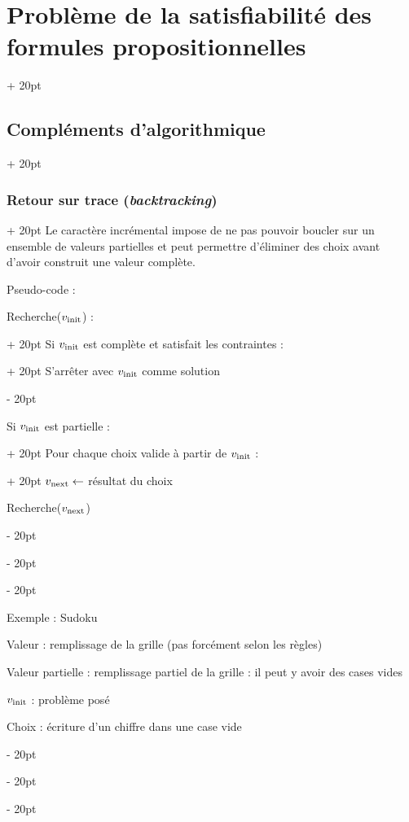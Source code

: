 \documentclass[a4paper, 12pt, twoside]{article}
\newcommand{\ind}[1][20pt]{\advance\leftskip + #1}
\newcommand{\deind}[1][20pt]{\advance\leftskip - #1}
\newenvironment{indt}[2][20pt]{#2 \par \ind[#1]}{\par \deind} %
\begin{document}
\begin{indt}{\section{Problème de la satisfiabilité des formules propositionnelles}}
\begin{indt}{\subsection{Compléments d'algorithmique}}
\begin{indt}{\subsubsection{Retour sur trace (\textit{backtracking})}}
                Le caractère incrémental impose de ne pas pouvoir boucler sur un ensemble de valeurs partielles et peut permettre d'éliminer des choix avant d'avoir construit une valeur complète.
                
                \vspace{12pt}
                
                Pseudo-code :
                
                \begin{pseudocode}
                    \begin{indt}{Recherche($v_{\rm init}$) :}
                        \begin{indt}{Si $v_{\rm init}$ est complète et satisfait les contraintes :}
                            S'arrêter avec $v_{\rm init}$ comme solution
                        \end{indt}
                        
                        \vspace{6pt}
                        
                        \begin{indt}{Si $v_{\rm init}$ est partielle :}
                            \begin{indt}{Pour chaque choix valide à partir de $v_{\rm init}$ :}
                                $v_{\rm next} \leftarrow$ résultat du choix
                                
                                Recherche($v_{\rm next}$)
                            \end{indt}
                        \end{indt}
                    \end{indt}
                \end{pseudocode}
                
                \vspace{12pt}
                
                Exemple : Sudoku
                
                Valeur : remplissage de la grille (pas forcément selon les règles)
                
                Valeur partielle : remplissage partiel de la grille : il peut y avoir des cases vides
                
                $v_{\rm init}$ : problème posé
                
                Choix : écriture d'un chiffre dans une case vide
                

\end{indt}
\end{indt}
\end{indt}
\end{document}
